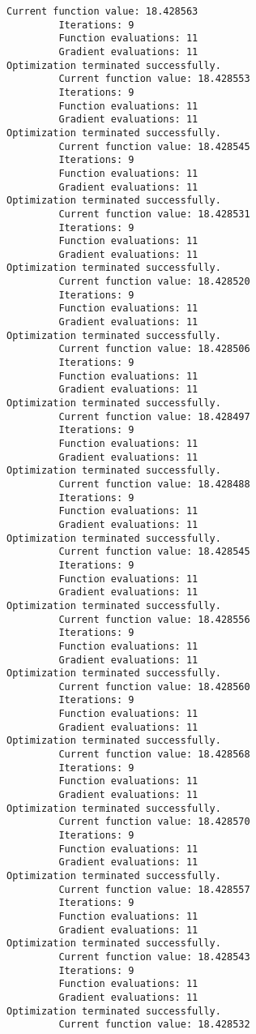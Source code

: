 \documentclass[11pt]{article}
\begin{document}
\begin{Verbatim}[commandchars=\\\{\}]
         Current function value: 18.428563
         Iterations: 9
         Function evaluations: 11
         Gradient evaluations: 11
Optimization terminated successfully.
         Current function value: 18.428553
         Iterations: 9
         Function evaluations: 11
         Gradient evaluations: 11
Optimization terminated successfully.
         Current function value: 18.428545
         Iterations: 9
         Function evaluations: 11
         Gradient evaluations: 11
Optimization terminated successfully.
         Current function value: 18.428531
         Iterations: 9
         Function evaluations: 11
         Gradient evaluations: 11
Optimization terminated successfully.
         Current function value: 18.428520
         Iterations: 9
         Function evaluations: 11
         Gradient evaluations: 11
Optimization terminated successfully.
         Current function value: 18.428506
         Iterations: 9
         Function evaluations: 11
         Gradient evaluations: 11
Optimization terminated successfully.
         Current function value: 18.428497
         Iterations: 9
         Function evaluations: 11
         Gradient evaluations: 11
Optimization terminated successfully.
         Current function value: 18.428488
         Iterations: 9
         Function evaluations: 11
         Gradient evaluations: 11
Optimization terminated successfully.
         Current function value: 18.428545
         Iterations: 9
         Function evaluations: 11
         Gradient evaluations: 11
Optimization terminated successfully.
         Current function value: 18.428556
         Iterations: 9
         Function evaluations: 11
         Gradient evaluations: 11
Optimization terminated successfully.
         Current function value: 18.428560
         Iterations: 9
         Function evaluations: 11
         Gradient evaluations: 11
Optimization terminated successfully.
         Current function value: 18.428568
         Iterations: 9
         Function evaluations: 11
         Gradient evaluations: 11
Optimization terminated successfully.
         Current function value: 18.428570
         Iterations: 9
         Function evaluations: 11
         Gradient evaluations: 11
Optimization terminated successfully.
         Current function value: 18.428557
         Iterations: 9
         Function evaluations: 11
         Gradient evaluations: 11
Optimization terminated successfully.
         Current function value: 18.428543
         Iterations: 9
         Function evaluations: 11
         Gradient evaluations: 11
Optimization terminated successfully.
         Current function value: 18.428532

\end{Verbatim}
\end{document}

